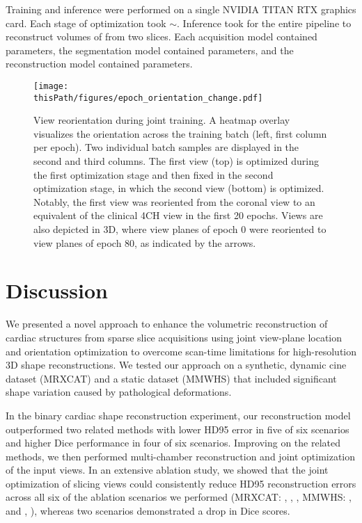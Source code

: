     Training and inference were performed on a single NVIDIA TITAN RTX  graphics card. Each stage of optimization took $\sim$.
    Inference took  for the entire pipeline to reconstruct volumes of  from two  slices. Each acquisition model contained  parameters, the segmentation model contained  parameters, and the reconstruction model contained  parameters.
    \begin{figure}

            \texttt{[image: \\thisPath/figures/epoch\_orientation\_change.pdf]}
            \caption{View reorientation during joint training. A heatmap overlay visualizes the orientation across the training batch (left, first column per epoch). Two individual batch samples are displayed in the second and third columns. The first view (top) is optimized during the first optimization stage and then fixed in the second optimization stage, in which the second view (bottom) is optimized. Notably, the first view was reoriented from the coronal view to an equivalent of the clinical 4CH view in the first 20 epochs. Views are also depicted in 3D, where view planes of epoch 0 were reoriented to view planes of epoch 80, as indicated by the arrows.}
        \label{fig:resulting_views}
    \end{figure}

\section{Discussion}

     We presented a novel approach to enhance the volumetric reconstruction of cardiac structures from sparse slice acquisitions using joint view-plane location and orientation optimization to overcome scan-time limitations for high-resolution 3D shape reconstructions.
    We tested our approach on a synthetic, dynamic cine dataset (MRXCAT) and a static dataset (MMWHS) that included significant shape variation caused by pathological deformations.

    In the binary cardiac shape reconstruction experiment, our reconstruction model outperformed two related methods with lower HD95 error in five of six scenarios and higher Dice performance in four of six scenarios. Improving on the related methods, we then performed multi-chamber reconstruction and joint optimization of the input views. In an extensive ablation study, we showed that the joint optimization of slicing views could consistently reduce HD95 reconstruction errors across all six of the ablation scenarios we performed (MRXCAT: , , , MMWHS: , and , ), whereas two scenarios demonstrated a drop in Dice scores.

